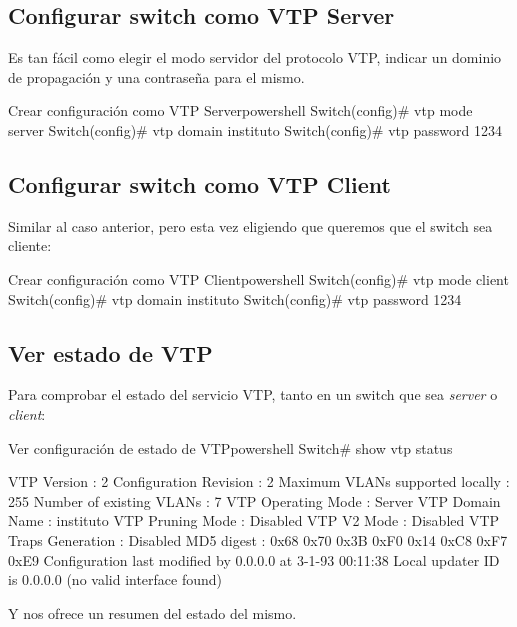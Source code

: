 \subsection{Configurar switch como VTP Server}
Es tan fácil como elegir el modo servidor del protocolo VTP, indicar un dominio de propagación y una contraseña para el mismo.

\begin{mycode}{Crear configuración como VTP Server}{powershell}{}
Switch(config)# vtp mode server
Switch(config)# vtp domain instituto
Switch(config)# vtp password 1234
\end{mycode}

\subsection{Configurar switch como VTP Client}
Similar al caso anterior, pero esta vez eligiendo que queremos que el switch sea cliente:

\begin{mycode}{Crear configuración como VTP Client}{powershell}{}
    Switch(config)# vtp mode client
    Switch(config)# vtp domain instituto
    Switch(config)# vtp password 1234
\end{mycode}

\subsection{Ver estado de VTP}
Para comprobar el estado del servicio VTP, tanto en un switch que sea \textit{server} o \textit{client}:

\begin{mycode}{Ver configuración de estado de VTP}{powershell}{}
Switch# show vtp status

VTP Version                     : 2
Configuration Revision          : 2
Maximum VLANs supported locally : 255
Number of existing VLANs        : 7
VTP Operating Mode              : Server
VTP Domain Name                 : instituto
VTP Pruning Mode                : Disabled
VTP V2 Mode                     : Disabled
VTP Traps Generation            : Disabled
MD5 digest                      : 0x68 0x70 0x3B 0xF0 0x14 0xC8 0xF7 0xE9
Configuration last modified by 0.0.0.0 at 3-1-93 00:11:38
Local updater ID is 0.0.0.0 (no valid interface found)
\end{mycode}

Y nos ofrece un resumen del estado del mismo.



